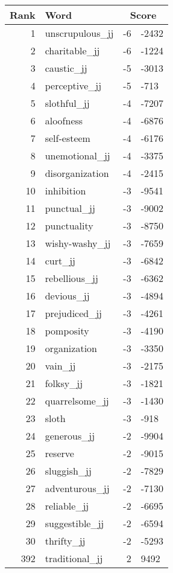 \begin{longtable}[!htbp]{| rlr@{.}l |}
    \hline
    \textbf{Rank} & \textbf{Word} & \multicolumn{2}{c|}{\textbf{Score}} \\
    \hline
    \endhead
    1 & unscrupulous\_jj & -6 & -2432 \\
    2 & charitable\_jj & -6 & -1224 \\
    3 & caustic\_jj & -5 & -3013 \\
    4 & perceptive\_jj & -5 & -713 \\
    5 & slothful\_jj & -4 & -7207 \\
    6 & aloofness & -4 & -6876 \\
    7 & self-esteem & -4 & -6176 \\
    8 & unemotional\_jj & -4 & -3375 \\
    9 & disorganization & -4 & -2415 \\
    10 & inhibition & -3 & -9541 \\
    11 & punctual\_jj & -3 & -9002 \\
    12 & punctuality & -3 & -8750 \\
    13 & wishy-washy\_jj & -3 & -7659 \\
    14 & curt\_jj & -3 & -6842 \\
    15 & rebellious\_jj & -3 & -6362 \\
    16 & devious\_jj & -3 & -4894 \\
    17 & prejudiced\_jj & -3 & -4261 \\
    18 & pomposity & -3 & -4190 \\
    19 & organization & -3 & -3350 \\
    20 & vain\_jj & -3 & -2175 \\
    21 & folksy\_jj & -3 & -1821 \\
    22 & quarrelsome\_jj & -3 & -1430 \\
    23 & sloth & -3 & -918 \\
    24 & generous\_jj & -2 & -9904 \\
    25 & reserve & -2 & -9015 \\
    26 & sluggish\_jj & -2 & -7829 \\
    27 & adventurous\_jj & -2 & -7130 \\
    28 & reliable\_jj & -2 & -6695 \\
    29 & suggestible\_jj & -2 & -6594 \\
    30 & thrifty\_jj & -2 & -5293 \\
    392 & traditional\_jj & 2 & 9492 \\

\end{longtable}
